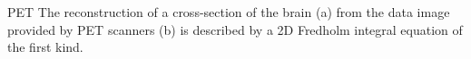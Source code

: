\documentclass[aspectratio=149]{beamer}
\begin{document}
\begin{frame}{PET}
The reconstruction of a cross-section of the brain (a) from the data image provided by PET scanners (b) is described by a 2D Fredholm integral equation of the first kind.

\begin{figure}
\setcounter{subfigure}{0}
\centering
{}\qquad
{}
\end{figure}
\end{frame}
\end{document}
